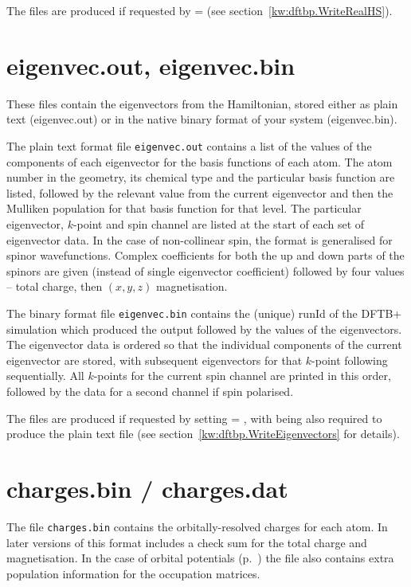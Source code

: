 The files are produced if requested by  = 
(see section~\ref{kw:dftbp.WriteRealHS}).

\section{eigenvec.out, eigenvec.bin}
\label{sec:dftbp.eigenvec}

These files contain the eigenvectors from the Hamiltonian, stored
either as plain text (eigenvec.out) or in the native binary format of
your system (eigenvec.bin).

The plain text format file \verb|eigenvec.out| contains a list of the values of
the components of each eigenvector for the basis functions of each atom. The
atom number in the geometry, its chemical type and the particular basis function
are listed, followed by the relevant value from the current eigenvector and then
the Mulliken population for that basis function for that level. The particular eigenvector, $k$-point and spin
channel are listed at the start of each set of eigenvector data. In the case of
non-collinear spin, the format is generalised for spinor wavefunctions. Complex
coefficients for both the up and down parts of the spinors are given (instead of
single eigenvector coefficient) followed by four values -- total charge, then
$(x,y,z)$ magnetisation.

The binary format file \verb|eigenvec.bin| contains the (unique) runId of the
DFTB+ simulation which produced the output followed by the values of the
eigenvectors. The eigenvector data is ordered so that the individual components
of the current eigenvector are stored, with subsequent eigenvectors for that
$k$-point following sequentially. All $k$-points for the current spin channel
are printed in this order, followed by the data for a second channel if spin
polarised.

The files are produced if requested by setting  =
, with  being also required to produce the plain
text file (see section~\ref{kw:dftbp.WriteEigenvectors} for details).

\section{charges.bin / charges.dat}
\label{sec:charges.bin}

The file \verb|charges.bin| contains the orbitally-resolved charges for each
atom. In later versions of \dftbp{} this format includes a check sum for the
total charge and magnetisation. In the case of orbital potentials
(p.~) the file also contains extra population information for
the occupation matrices.

